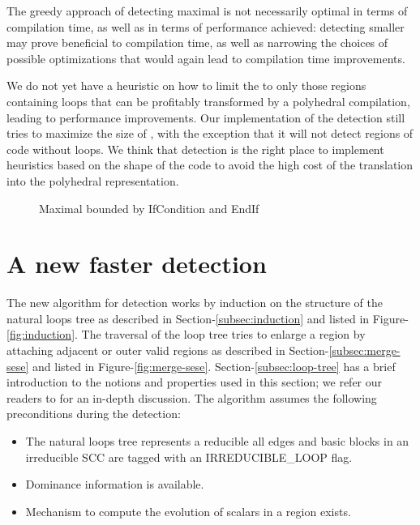 \documentclass{sig-alternate}
\begin{document}
The greedy approach of detecting maximal  is not necessarily optimal in
terms of compilation time, as well as in terms of performance achieved:
detecting smaller  may prove beneficial to compilation time, as well as
narrowing the choices of possible optimizations that would again lead to
compilation time improvements.

We do not yet have a heuristic on how to limit the  to only those
regions containing loops that can be profitably transformed by a polyhedral
compilation, leading to performance improvements.  Our implementation of the
\SCoP{} detection still tries to maximize the size of , with the
exception that it will not detect regions of code without loops.  We think that
\SCoP{} detection is the right place to implement heuristics based on the shape
of the code to avoid the high cost of the translation into the polyhedral
representation.

\begin{figure}
\centering

\caption{Maximal \SCoP{} bounded by IfCondition and EndIf}
\label{fig:maximality}
\end{figure}

\section{A new faster \SCoP{} detection}
\label{sec:new-SCoP-detection}
The new algorithm for \SCoP{} detection works by induction on the structure of the
natural loops tree as described in Section-\ref{subsec:induction} and listed in
Figure-\ref{fig:induction}.  The traversal of the loop tree tries to enlarge a
region by attaching adjacent or outer valid regions as described in
Section-\ref{subsec:merge-sese} and listed in Figure-\ref{fig:merge-sese}.
Section-\ref{subsec:loop-tree} has a brief introduction to the notions and
properties used in this section; we refer our readers to \cite{ramalingam} for
an in-depth discussion.  The algorithm assumes the following preconditions
during the \SCoP{} detection:
\begin{itemize}
\item The natural loops tree represents a reducible \CFG{:} all edges and basic
  blocks in an irreducible SCC are tagged with an IRREDUCIBLE\_LOOP flag.
\item Dominance information is available.
\item Mechanism to compute the evolution of scalars in a region exists.
\end{itemize}
\end{document}
